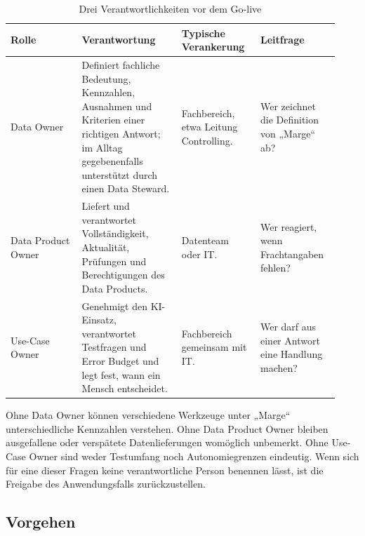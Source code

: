 \documentclass[a4paper,12pt]{article}
\theoremstyle{definition}
\begin{document}
\begin{table}[htbp]
\centering
\small
\caption{Drei Verantwortlichkeiten vor dem Go-live}
\label{tab:accountabilities}
\begin{tabular}{p{0.20\linewidth}p{0.29\linewidth}p{0.22\linewidth}p{0.22\linewidth}}
\toprule
\textbf{Rolle} & \textbf{Verantwortung} & \textbf{Typische Verankerung} & \textbf{Leitfrage} \\
\midrule
Data Owner & Definiert fachliche Bedeutung, Kennzahlen, Ausnahmen und Kriterien einer richtigen Antwort; im Alltag gegebenenfalls unterstützt durch einen Data Steward. & Fachbereich, etwa Leitung Controlling. & Wer zeichnet die Definition von „Marge“ ab? \\
Data Product Owner & Liefert und verantwortet Vollständigkeit, Aktualität, Prüfungen und Berechtigungen des Data Products. & Datenteam oder IT. & Wer reagiert, wenn Frachtangaben fehlen? \\
Use-Case Owner & Genehmigt den KI-Einsatz, verantwortet Testfragen und Error Budget und legt fest, wann ein Mensch entscheidet. & Fachbereich gemeinsam mit IT. & Wer darf aus einer Antwort eine Handlung machen? \\
\bottomrule
\end{tabular}
\end{table}

Ohne Data Owner können verschiedene Werkzeuge unter „Marge“ unterschiedliche Kennzahlen verstehen. Ohne Data Product Owner bleiben ausgefallene oder verspätete Datenlieferungen womöglich unbemerkt. Ohne Use-Case Owner sind weder Testumfang noch Autonomiegrenzen eindeutig. Wenn sich für eine dieser Fragen keine verantwortliche Person benennen lässt, ist die Freigabe des Anwendungsfalls zurückzustellen.

\subsection{Vorgehen}
\end{document}
